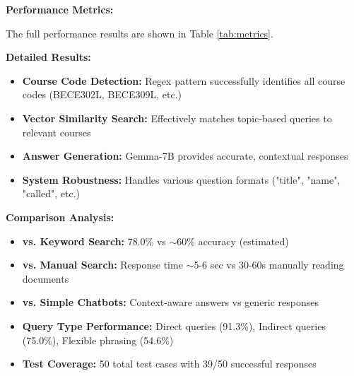 \documentclass[conference]{IEEEtran}
\begin{document}
\textbf{Performance Metrics:}

The full performance results are shown in Table \ref{tab:metrics}.

\begin{table}[t!]
\caption{Performance Metrics}
\centering
{}
\label{tab:metrics}
\end{table}

\textbf{Detailed Results:}
\begin{itemize}
    \item \textbf{Course Code Detection:} Regex pattern successfully identifies all course codes (BECE302L, BECE309L, etc.)
    \item \textbf{Vector Similarity Search:} Effectively matches topic-based queries to relevant courses
    \item \textbf{Answer Generation:} Gemma-7B provides accurate, contextual responses
    \item \textbf{System Robustness:} Handles various question formats ("title", "name", "called", etc.)
\end{itemize}

\textbf{Comparison Analysis:}
\begin{itemize}
    \item \textbf{vs. Keyword Search:} 78.0\% vs $\sim$60\% accuracy (estimated)
    \item \textbf{vs. Manual Search:} Response time $\sim$5-6 sec vs 30-60s manually reading documents  
    \item \textbf{vs. Simple Chatbots:} Context-aware answers vs generic responses
    \item \textbf{Query Type Performance:} Direct queries (91.3\%), Indirect queries (75.0\%), Flexible phrasing (54.6\%)
    \item \textbf{Test Coverage:} 50 total test cases with 39/50 successful responses
\end{itemize}
\end{document}

